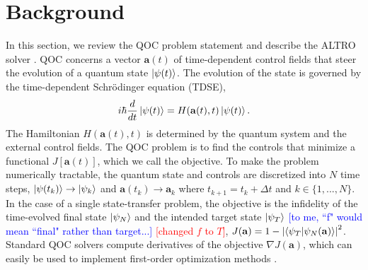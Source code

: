 \section{Background \label{sec:background}}
In this section, we
review the QOC problem statement
and describe the ALTRO solver \cite{howell2019altro}.
QOC concerns a vector $\mathbf{a}(t)$ of time-dependent control fields
that steer the evolution of a quantum state $\ket{\psi(t)}$.
The evolution of the state is governed by the time-dependent
Schr{\"o}dinger equation (TDSE),
\begin{equation}
  i \hbar \frac{d}{dt} \ket{\psi(t)} = H(\mathbf{a}(t), t) \ket{\psi(t)}.
  \label{eq:tdse}
\end{equation}
The Hamiltonian $H(\mathbf{a}(t), t)$ is determined by the quantum system and the external control fields.
The QOC problem is to find the
controls that minimize a functional $J[\mathbf{a}(t)]$,
which we call the objective.
To make the problem numerically tractable,
the quantum state and controls are discretized into $N$ time steps,
$\ket{\psi(t_{k})} \to \ket{\psi_k}$ and $\mathbf{a}(t_{k}) \to \mathbf{a}_k$ where
$t_{k + 1} = t_{k} + \Delta t$ and $k \in \{1, ..., N\}$.
In the case of a single state-transfer problem, the objective is
the infidelity of the time-evolved final state $\ket{\psi_N}$ and
the intended target state $\ket{\psi_T}$
\textcolor{blue}{[to me, ``f" would mean ``final" rather than target...]}
\textcolor{red}{[changed $f$ to $T$]},
$J(\mathbf{a}) = 1 - {\lvert \braket{\psi_{T}}{\psi_{N}(\mathbf{a})} \rvert}^{2}$.
Standard QOC solvers compute derivatives of the objective $\nabla J(\mathbf{a})$,
which can easily be used to implement first-order optimization methods
\cite{machnes2015tunable, khaneja2005optimal, leung2017speedup, goerz2019krotov}.


